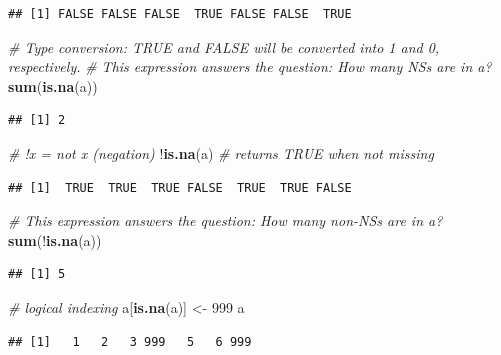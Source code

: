 \documentclass[]{book}
\newenvironment{Shaded}{\begin{snugshade}}{\end{snugshade}}
\newcommand{\KeywordTok}[1]{\textcolor[rgb]{0.13,0.29,0.53}{\textbf{{#1}}}}
\newcommand{\DecValTok}[1]{\textcolor[rgb]{0.00,0.00,0.81}{{#1}}}
\newcommand{\StringTok}[1]{\textcolor[rgb]{0.31,0.60,0.02}{{#1}}}
\newcommand{\CommentTok}[1]{\textcolor[rgb]{0.56,0.35,0.01}{\textit{{#1}}}}
\newcommand{\NormalTok}[1]{{#1}}
\begin{document}
\begin{verbatim}
## [1] FALSE FALSE FALSE  TRUE FALSE FALSE  TRUE
\end{verbatim}

\begin{Shaded}
\begin{Highlighting}[]
\CommentTok{# Type conversion: TRUE and FALSE will be converted into 1 and 0, respectively. }
\CommentTok{# This expression answers the question: How many NSs are in a?}
\KeywordTok{sum}\NormalTok{(}\KeywordTok{is.na}\NormalTok{(a))}
\end{Highlighting}
\end{Shaded}

\begin{verbatim}
## [1] 2
\end{verbatim}

\begin{Shaded}
\begin{Highlighting}[]
\CommentTok{# !x = not x (negation)}
\NormalTok{!}\KeywordTok{is.na}\NormalTok{(a)  }\CommentTok{# returns TRUE when not missing}
\end{Highlighting}
\end{Shaded}

\begin{verbatim}
## [1]  TRUE  TRUE  TRUE FALSE  TRUE  TRUE FALSE
\end{verbatim}

\begin{Shaded}
\begin{Highlighting}[]
\CommentTok{# This expression answers the question: How many non-NSs are in a?}
\KeywordTok{sum}\NormalTok{(!}\KeywordTok{is.na}\NormalTok{(a))}
\end{Highlighting}
\end{Shaded}

\begin{verbatim}
## [1] 5
\end{verbatim}

\begin{Shaded}
\begin{Highlighting}[]
\CommentTok{# logical indexing}
\NormalTok{a[}\KeywordTok{is.na}\NormalTok{(a)] <-}\StringTok{ }\DecValTok{999}
\NormalTok{a}
\end{Highlighting}
\end{Shaded}

\begin{verbatim}
## [1]   1   2   3 999   5   6 999
\end{verbatim}
\end{document}
